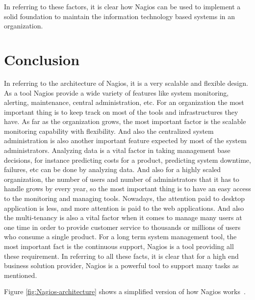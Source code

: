 \documentclass[9pt,twocolumn,twoside]{styles/osajnl}
\begin{document}
In referring to these factors, it is clear how Nagios can be used to implement a solid foundation to maintain the information technology based systems in an organization.

\section{Conclusion}

In referring to the architecture of Nagios, it is a very scalable and flexible design. As a tool Nagios provide a wide variety of features like system monitoring, alerting, maintenance, central administration, etc. For an organization the most important thing is to keep track on most of the tools and infrastructures they have. As far as the organization grows, the most important factor is the scalable monitoring capability with flexibility. And also the centralized system administration is also another important feature expected by most of the system administrators. Analyzing data is a vital factor in taking management base decisions, for instance predicting costs for a product, predicting system downtime, failures, etc can be done by analyzing data. And also for a highly scaled organization, the number of users and number of administrators that it has to handle grows by every year, so the most important thing is to have an easy access to the monitoring and managing tools. Nowadays, the attention paid to desktop application is less, and more attention is paid to the web applications. And also the multi-tenancy is also a vital factor when it comes to manage many users at one time in order to provide customer service to thousands or millions of users who consume a single product. For a long term system management tool, the most important fact is the continuous support, Nagios is a tool providing all these requirement. In referring to all these facts, it is clear that for a high end business solution provider, Nagios is a powerful tool to support many tasks as mentioned. 


Figure \ref{fig:Nagios-architecture} shows a simplified version of how Nagios works~\cite{nagios-book}.





 



\appendix 
\end{document}
